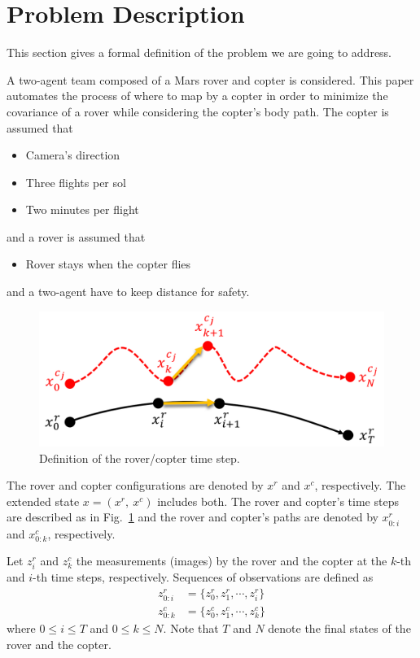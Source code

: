 \documentclass[conference]{IEEEtran}
\begin{document}
\clearpage
\section{Problem Description}
This section gives a formal definition of the problem we are going to address. 

A two-agent team composed of a Mars rover and copter is considered. This paper automates the process of where to map by a copter in order to minimize the covariance of a rover while considering the copter’s body path.
The copter is assumed that
\begin{itemize}
    \item Camera’s direction 
    \item Three flights per sol
    \item Two minutes per flight
\end{itemize}
and a rover is assumed that
\begin{itemize}
    \item Rover stays when the copter flies
\end{itemize}
and a two-agent have to keep distance for safety.
 
 \begin{figure}[b]
		\centering
		\includegraphics[width=0.8\columnwidth]{figs/8_3.png}
		\caption{Definition of the rover/copter time step.}
		\label{fig:8_3}
\end{figure}

The rover and copter configurations are denoted by $x^r$ and $x^c$, respectively. The extended state $x=(x^r,~x^c)$ includes both.
The rover and copter's time steps are described as in Fig.~\ref{fig:8_3} and the rover and copter's paths are denoted by $x^r_{0:i}$ and $x^c_{0:k}$, respectively.

Let $z^r_i$ and $z^c_k$ the measurements (images) by the rover and the copter at the $k$-th and $i$-th time steps, respectively. Sequences of observations are defined as
\begin{align}
    z^r_{0:i}&=\{z^r_0,z^r_1,\cdots,z^r_i\}\\
    z^c_{0:k}&=\{z^c_{0},z^c_{1},\cdots,z^c_{k}\}
\end{align}
where $0 \leq i \leq T$ and $0 \leq k \leq N$. Note that $T$ and $N$ denote the final states of the rover and the copter.
\end{document}
